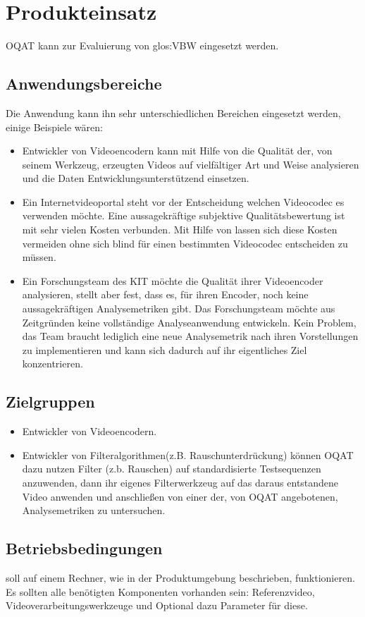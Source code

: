 \chapter{Produkteinsatz}
\gls{OQAT} kann zur Evaluierung von \gls{glos:VBW} eingesetzt werden. 
\section{Anwendungsbereiche}
Die Anwendung kann ihn sehr unterschiedlichen Bereichen eingesetzt werden, einige Beispiele wären:
\begin{itemize}
\item Entwickler von Videoencodern kann mit Hilfe von \projektTitel die Qualität der, von seinem
		Werkzeug, erzeugten Videos auf vielfältiger Art und Weise analysieren und die Daten
		Entwicklungsunterstützend einsetzen.
\item Ein Internetvideoportal steht vor der Entscheidung welchen Videocodec es verwenden möchte.
		Eine aussagekräftige subjektive Qualitätsbewertung ist mit sehr vielen Kosten verbunden.
		Mit Hilfe von \projektTitel lassen sich diese Kosten vermeiden ohne sich blind für
		einen bestimmten Videocodec entscheiden zu müssen.
\item Ein Forschungsteam des \gls{KIT} möchte die Qualität ihrer Videoencoder analysieren, stellt
		aber fest, dass es, für ihren Encoder, noch keine aussagekräftigen Analysemetriken gibt.
		Das Forschungsteam möchte aus Zeitgründen keine vollständige Analyseanwendung entwickeln.
		Kein Problem, das Team braucht lediglich \projektTitel eine neue Analysemetrik nach ihren
		Vorstellungen zu implementieren und kann sich dadurch auf ihr eigentliches Ziel konzentrieren. 
\end{itemize}
\section{Zielgruppen}
\begin{itemize}
\item Entwickler von Videoencodern.
\item Entwickler von Filteralgorithmen(z.B. Rauschunterdrückung) können \gls{OQAT} dazu nutzen Filter (z.b. Rauschen) auf standardisierte Testsequenzen anzuwenden, dann ihr eigenes Filterwerkzeug auf das daraus entstandene Video anwenden und anschließen von einer der, von \gls{OQAT} angebotenen, Analysemetriken zu untersuchen.
\end{itemize}
\section{Betriebsbedingungen}
\projektTitel soll auf einem Rechner, wie in der Produktumgebung beschrieben, funktionieren.
Es sollten alle benötigten Komponenten vorhanden sein:
Referenzvideo, Videoverarbeitungswerkzeuge und Optional dazu Parameter für diese.